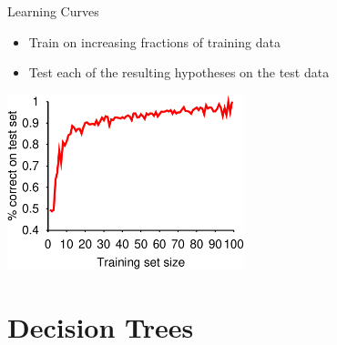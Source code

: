\documentclass[12pt]{beamer}
\begin{document}
\begin{frame}{Learning Curves}
	\begin{itemize}
		\item Train on increasing fractions of training data
		\item Test each of the resulting hypotheses on the test data
	\end{itemize}
	\pause
	\begin{center}
		\includegraphics[height=2in]{restaurant-dtl-curve}
	\end{center}
\end{frame}


\section{Decision Trees}
\end{document}
